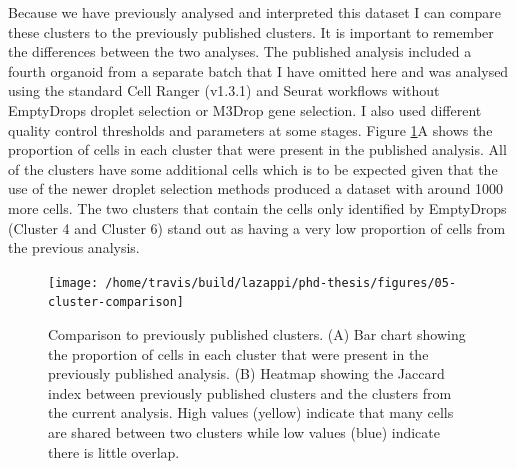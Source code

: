 \documentclass[11pt,a4paper,titlepage,twoside,openright]{style/unimelbthesis}
\theoremstyle{definition}
\theoremstyle{definition}
\theoremstyle{definition}
\theoremstyle{remark}
\begin{document}
\begin{mainmatter}
Because we have previously analysed and interpreted this dataset I can compare these clusters to the previously published clusters. It is important to remember the differences between the two analyses. The published analysis included a fourth organoid from a separate batch that I have omitted here and was analysed using the standard Cell Ranger (v1.3.1) and Seurat workflows without EmptyDrops droplet selection or M3Drop gene selection. I also used different quality control thresholds and parameters at some stages. Figure \ref{fig:cluster-comparison}A shows the proportion of cells in each cluster that were present in the published analysis. All of the clusters have some additional cells which is to be expected given that the use of the newer droplet selection methods produced a dataset with around 1000 more cells. The two clusters that contain the cells only identified by EmptyDrops (Cluster 4 and Cluster 6) stand out as having a very low proportion of cells from the previous analysis.

\begin{figure}

{\centering \texttt{[image: /home/travis/build/lazappi/phd-thesis/figures/05-cluster-comparison]} 

}

\caption[Comparison to previously published clusters.]{Comparison to previously published clusters. (A) Bar chart showing the proportion of cells in each cluster that were present in the previously published analysis. (B) Heatmap showing the Jaccard index between previously published clusters and the clusters from the current analysis. High values (yellow) indicate that many cells are shared between two clusters while low values (blue) indicate there is little overlap.}\label{fig:cluster-comparison}
\end{figure}






\end{mainmatter}
\end{document}
